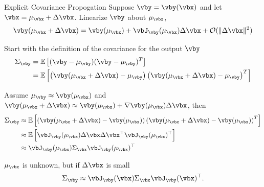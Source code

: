 \documentclass[8pt,aspectratio=169]{beamer}
\begin{document}
\begin{frame}[fragile]{Explicit Covariance Propogation}
  Suppose $\vby = \vby(\vbx)$ and let $\vbx = \mu_{\vbx}+\Delta\vbx$. Linearize $\vby$ about $\mu_{\vbx}$,
  \[
  \vby(\mu_{\vbx}+\Delta\vbx)=\vby(\mu_{\vbx})+\vbJ_{\vby}(\mu_{\vbx})\Delta \vbx + \mathcal{O}(\|\Delta\vbx\|^2)
  \]

  Start with the definition of the covariance for the output $\vby$
  \begin{align*}
    \Sigma_{\vby} &= \mathbb{E}\left[(\vby-\mu_{\vby})(\vby-\mu_{\vby})^{T}\right] \\
    &= \mathbb{E}\left[\left(\vby(\mu_{\vbx}+\Delta\vbx)-\mu_{\vby}\right)\left(\vby(\mu_{\vbx}+\Delta\vbx)-\mu_{\vby}\right)^{T}\right] 
  \end{align*}

  Assume $\mu_{\vby} \approx \vby(\mu_{\vbx})$ and $\vby(\mu_{\vbx}+\Delta\vbx) \approx \vby(\mu_{\vbx})+\nabla \vby(\mu_{\vbx})\Delta \vbx$, then 
  \begin{align*}
    \Sigma_{\vby} & \approx \mathbb{E}\left[\left(\vby(\mu_{\vbx}+\Delta\vbx)-\vby(\mu_{\vbx})\right)\left(\vby(\mu_{\vbx}+\Delta\vbx)-\vby(\mu_{\vbx})\right)^{T}\right] \\
    & \approx \mathbb{E}\left[\vbJ_{\vby}(\mu_{\vbx})\Delta\vbx\Delta\vbx^{\T}\vbJ_{\vby}(\mu_{\vbx})^{\T}\right] \\
    & \approx \vbJ_{\vby}(\mu_{\vbx})\Sigma_{\vbx}\vbJ_{\vby}(\mu_{\vbx})^{\T}
  \end{align*}
  
  $\mu_{\vbx}$ is unknown, but if $\Delta\vbx$ is small
  \begin{equation}
    \label{eq:cov_prop}
    \Sigma_{\vby} \approx \vbJ_{\vby}(\vbx)\Sigma_{\vbx}\vbJ_{\vby}(\vbx)^{\T}.
  \end{equation}
\end{frame}
\end{document}
